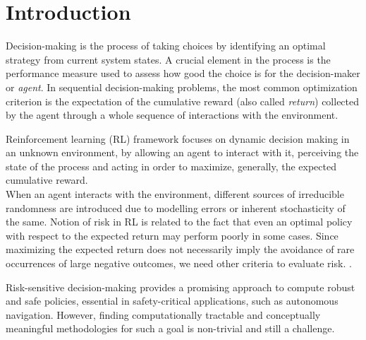\chapter{Introduction}
\label{sec:introduction}


Decision-making is the process of taking choices by identifying an optimal strategy
from current system states. A crucial element in the process is the performance measure used
to assess how good the choice is for the decision-maker or \textit{agent}.
In sequential decision-making problems, the most common optimization criterion is the 
expectation of the cumulative reward (also called \textit{return}) 
collected by the agent through a whole sequence
of interactions with the environment.


Reinforcement learning (RL) framework focuses on dynamic decision making in an unknown environment, by
allowing an agent to interact with it, perceiving the state of the process and acting in order to
maximize, generally, the expected cumulative reward.\\
When an agent interacts with the environment, different sources of irreducible 
randomness are introduced due to modelling errors or inherent stochasticity of the same.
Notion of risk in RL is related to the fact that even an optimal policy with respect to the 
expected return may perform poorly in some cases.
Since maximizing the expected return does not necessarily imply the avoidance
of rare occurrences of large negative outcomes,
we need other criteria to evaluate risk. \citep{Garcia2015}.

Risk-sensitive decision-making provides a promising
approach to compute robust and safe policies, essential in safety-critical applications,
such as autonomous navigation.
However, finding computationally tractable and conceptually meaningful methodologies for
such a goal is non-trivial and still a challenge.

